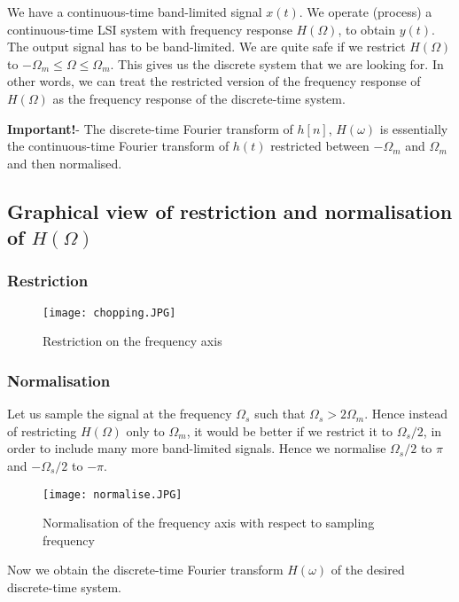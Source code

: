 We have a continuous-time band-limited signal $x(t)$. We operate (process) a continuous-time LSI system with frequency response $H(\Omega)$, to obtain $y(t)$. The output signal has to be band-limited. We are quite safe if we restrict $H(\Omega)$ to $-\Omega_{m} \leq \Omega \leq \Omega_{m}$. This gives us the discrete system that we are looking for. In other words, we can treat the restricted version of the frequency response of $H(\Omega)$ as the frequency response of the discrete-time system. 

\textbf{Important!}- The discrete-time Fourier transform of $h[n]$, $H(\omega)$ is essentially the continuous-time Fourier transform of $h(t)$ restricted between $-\Omega_{m}$ and $\Omega_{m}$ and then normalised. 

\subsection{Graphical view of restriction and normalisation of $H(\Omega)$}
\subsubsection{Restriction}
\begin{figure}[h] 
        \centering
        
                \texttt{[image: chopping.JPG]}
                \caption{Restriction on the frequency axis}
                \label{chopping}
        
\end{figure}

\subsubsection{Normalisation}
Let us sample the signal at the frequency $\Omega_{s}$ such that $\Omega_{s} > 2 \Omega_{m}$. Hence instead of restricting $H(\Omega)$ only to $\Omega_{m}$, it would be better if we restrict it to $\Omega_{s}/2$, in order to include many more band-limited signals. Hence we normalise $\Omega_{s}/2$ to $\pi$ and $-\Omega_{s}/2$ to $-\pi$. 
\begin{figure}[h] 
        \centering
        
                \texttt{[image: normalise.JPG]}
                \caption{Normalisation of the frequency axis with respect to sampling frequency}
                \label{normalise}
        
\end{figure}
Now we obtain the discrete-time Fourier transform $H(\omega)$ of the desired discrete-time system.
\\

